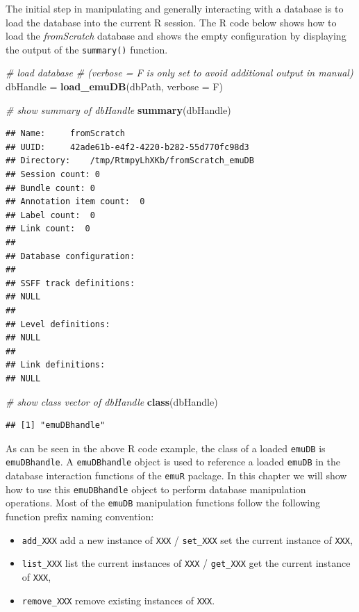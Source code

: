 \documentclass[]{book}
\newenvironment{Shaded}{\begin{snugshade}}{\end{snugshade}}
\newcommand{\CommentTok}[1]{\textcolor[rgb]{0.56,0.35,0.01}{\textit{#1}}}
\newcommand{\DataTypeTok}[1]{\textcolor[rgb]{0.13,0.29,0.53}{#1}}
\newcommand{\KeywordTok}[1]{\textcolor[rgb]{0.13,0.29,0.53}{\textbf{#1}}}
\newcommand{\NormalTok}[1]{#1}
\newcommand{\StringTok}[1]{\textcolor[rgb]{0.31,0.60,0.02}{#1}}
\providecommand{\tightlist}{%
  \setlength{\itemsep}{0pt}\setlength{\parskip}{0pt}}
\begin{document}
The initial step in manipulating and generally interacting with a database is to load the database into the current R session. The R code below shows how to load the \emph{fromScratch} database and shows the empty configuration by displaying the output of the \texttt{summary()} function.

\begin{Shaded}
\begin{Highlighting}[]
\CommentTok{# load database}
\CommentTok{# (verbose = F is only set to avoid additional output in manual)}
\NormalTok{dbHandle =}\StringTok{ }\KeywordTok{load_emuDB}\NormalTok{(dbPath, }\DataTypeTok{verbose =}\NormalTok{ F)}

\CommentTok{# show summary of dbHandle}
\KeywordTok{summary}\NormalTok{(dbHandle)}
\end{Highlighting}
\end{Shaded}

\begin{verbatim}
## Name:     fromScratch 
## UUID:     42ade61b-e4f2-4220-b282-55d770fc98d3 
## Directory:    /tmp/RtmpyLhXKb/fromScratch_emuDB 
## Session count: 0 
## Bundle count: 0 
## Annotation item count:  0 
## Label count:  0 
## Link count:  0 
## 
## Database configuration:
## 
## SSFF track definitions:
## NULL
## 
## Level definitions:
## NULL
## 
## Link definitions:
## NULL
\end{verbatim}

\begin{Shaded}
\begin{Highlighting}[]
\CommentTok{# show class vector of dbHandle}
\KeywordTok{class}\NormalTok{(dbHandle)}
\end{Highlighting}
\end{Shaded}

\begin{verbatim}
## [1] "emuDBhandle"
\end{verbatim}

As can be seen in the above R code example, the class of a loaded \texttt{emuDB} is \texttt{emuDBhandle}. A \texttt{emuDBhandle} object is used to reference a loaded \texttt{emuDB} in the database interaction functions of the \texttt{emuR} package. In this chapter we will show how to use this \texttt{emuDBhandle} object to perform database manipulation operations. Most of the \texttt{emuDB} manipulation functions follow the following function prefix naming convention:

\begin{itemize}
\tightlist
\item
  \texttt{add\_XXX} add a new instance of \texttt{XXX} / \texttt{set\_XXX} set the current instance of \texttt{XXX},
\item
  \texttt{list\_XXX} list the current instances of \texttt{XXX} / \texttt{get\_XXX} get the current instance of \texttt{XXX},
\item
  \texttt{remove\_XXX} remove existing instances of \texttt{XXX}.
\end{itemize}
\end{document}
